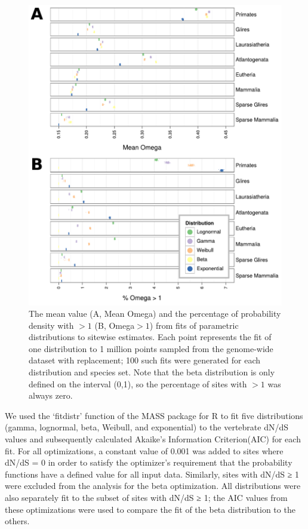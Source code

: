 \begin{figure}
\centering
\includegraphics[scale=0.85]{Figs/distribution_fit_plots.pdf}
\caption{The mean value (A, Mean Omega) and the percentage of probability
  density with \omg$>1$ (B, Omega$>1$) from \ml fits of parametric distributions to
  sitewise \ci estimates. Each point represents the \ml fit of one
  distribution to 1 million points sampled from the genome-wide
  dataset with replacement; 100 such fits were generated for each
  distribution and species set. Note that the beta distribution is
  only defined on the interval (0,1), so the percentage of sites with
  \omg$>1$ was always zero.}
\label{distribution_fit_plots}
\end{figure}


We used the ‘fitdistr’ function of the MASS package for R to fit five
distributions (gamma, lognormal, beta, Weibull, and exponential) to
the vertebrate dN/dS values and subsequently calculated Akaike’s
Information Criterion(AIC) for each fit. For all optimizations, a
constant value of 0.001 was added to sites where dN/dS = 0 in order to
satisfy the optimizer’s requirement that the probability functions
have a defined value for all input data. Similarly, sites with dN/dS ≥
1 were excluded from the analysis for the beta optimization. All
distributions were also separately fit to the subset of sites with
dN/dS ≥ 1; the AIC values from these optimizations were used to
compare the fit of the beta distribution to the others.

